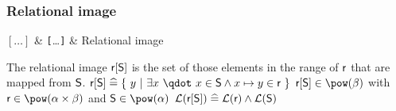 \begin{samepage}
\subsubsection{Relational image}
\label{relational_image}

\begin{rrnames}
  $[\ldots]$  & \texttt{[}\ldots\texttt{]}  & Relational image
\end{rrnames}
\begin{rodinrefentry}
  \rrdesc
    The relational image $\textsf{r}[\textsf{S}]$ is the set of those elements in the range of $\textsf{r}$
    that are mapped from $\textsf{S}$.
  \rrdef
    $\exprlr[\exprs] \defi \{~y~|~\exists x~\qdot~x\in \exprs\land x\mapsto y\in\exprlr~\}$
  \rrtypes
    $\exprlr[\exprs]\in\pow(\beta)$ with $\exprlr\in\pow(\alpha\cprod\beta)$ and $\exprs\in\pow(\alpha)$
  \rrwd
    $\mathcal{L}(\textsf{r}[\textsf{S}])\mathrel{\widehat=}\mathcal{L}(\textsf{r})\land\mathcal{L}(\textsf{S})$
\end{rodinrefentry}
\end{samepage}

